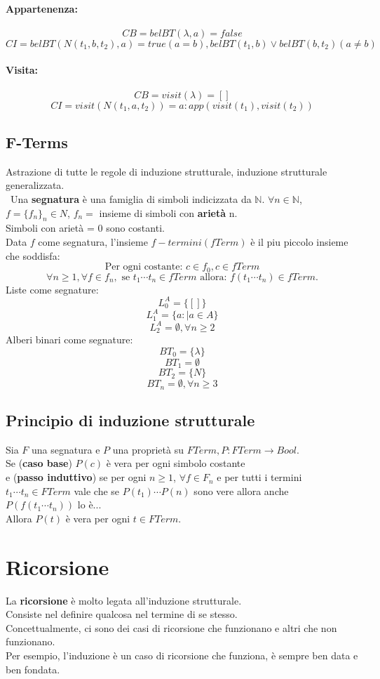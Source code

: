 \documentclass[a4paper,12pt]{article}
\let\oldsection\section
\renewcommand{\section}{\clearpage\oldsection}
\begin{document}
\paragraph{Appartenenza: }
\[
CB = belBT(\lambda, a) = false
\]
\[
CI = belBT(N(t_1,b,t_2),a) = true (a = b), belBT(t_1,b) \lor belBT (b,t_2) (a \ne b)
\]
\paragraph{Visita: }
\[
CB = visit(\lambda) = []
\]
\[
CI = visit(N(t_1,a,t_2)) = a: app(visit(t_1),visit(t_2))
\]

\subsection{F-Terms}
Astrazione di tutte le regole di induzione strutturale, induzione strutturale generalizzata.\\\
Una \textbf{segnatura} è una famiglia di simboli indicizzata da $\mathbb{N}$. $\forall n \in \mathbb{N}$, $f = \{f_n\}_n \in N$, $f_n = $ insieme di simboli con \textbf{arietà} n.\\
Simboli con arietà = 0 sono costanti.\\
Data $f$ come segnatura, l'insieme $f-termini (fTerm)$ è il piu piccolo insieme che soddisfa:
\[
\text{Per ogni costante: } c \in f_0, c \in fTerm
\]
\[
\forall n \geq 1, \forall f \in f_n, \text{ se } t_1 \cdots t_n \in fTerm \text{ allora: } f(t_1 \cdots t_n) \in fTerm.
\]
Liste come segnature:
\[
L_0^A = \{[]\}
\]
\[
L_1^A = \{a: | a \in A\}
\]
\[
L_2^A = \emptyset,\forall n \geq 2
\]
Alberi binari come segnature:
\[
BT_0 = \{\lambda\}
\]
\[
BT_1 = \emptyset
\]
\[
BT_2 = \{N\}
\]
\[
BT_n = \emptyset,\forall n \geq 3
\]
\subsection{Principio di induzione strutturale}
Sia $F$ una segnatura e $P$ una proprietà su $FTerm,P:FTerm \rightarrow Bool$.\\
Se (\textbf{caso base}) $P(c)$ è vera per ogni simbolo costante \\
e (\textbf{passo induttivo}) se per ogni $n \geq 1$, $\forall f \in F_n$ e per tutti i termini $t_1 \cdots t_n \in FTerm$ vale che se $P(t_1) \cdots P(n)$ sono vere allora anche $P(f(t_1 \cdots t_n))$ lo è...\\
Allora $P(t)$ è vera per ogni $t \in FTerm$.
\section{Ricorsione}
La \textbf{ricorsione} è molto legata all'induzione strutturale.\\
Consiste nel definire qualcosa nel termine di se stesso.\\
Concettualmente, ci sono dei casi di ricorsione che funzionano e altri che non funzionano.\\
Per esempio, l'induzione è un caso di ricorsione che funziona, è sempre ben data e ben fondata.
\end{document}
